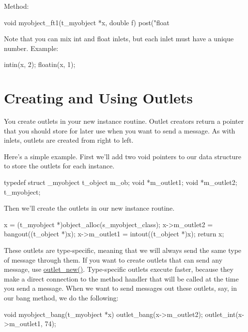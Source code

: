 Method: 
\begin{DoxyCode}
    void myobject_ft1(t_myobject *x, double f)
    {
        post("float %
    }
\end{DoxyCode}


Note that you can mix int and float inlets, but each inlet must have a unique number. Example: 
\begin{DoxyCode}
        intin(x, 2);
        floatin(x, 1);
\end{DoxyCode}
\hypertarget{chapter_inout_chapter_inout_outlets}{}\section{Creating and Using Outlets}\label{chapter_inout_chapter_inout_outlets}
You create outlets in your new instance routine. Outlet creators return a pointer that you should store for later use when you want to send a message. As with inlets, outlets are created from right to left.

Here's a simple example. First we'll add two void pointers to our data structure to store the outlets for each instance. 
\begin{DoxyCode}
    typedef struct _myobject
    {
        t_object m_ob;
        void *m_outlet1;
        void *m_outlet2;
    } t_myobject;
\end{DoxyCode}


Then we'll create the outlets in our new instance routine. 
\begin{DoxyCode}
        x = (t_myobject *)object_alloc(s_myobject_class);
        x->m_outlet2 = bangout((t_object *)x);
        x->m_outlet1 = intout((t_object *)x);
        return x;
\end{DoxyCode}


These outlets are type-\/specific, meaning that we will always send the same type of message through them. If you want to create outlets that can send any message, use \hyperlink{group__inout_ga451b3a1ec203ac8648a5399e209f070a}{outlet\_\-new()}. Type-\/specific outlets execute faster, because they make a direct connection to the method handler that will be called at the time you send a message. When we want to send messages out these outlets, say, in our bang method, we do the following:


\begin{DoxyCode}
    void myobject_bang(t_myobject *x)
    {
        outlet_bang(x->m_outlet2);
        outlet_int(x->m_outlet1, 74);
    }
\end{DoxyCode}


